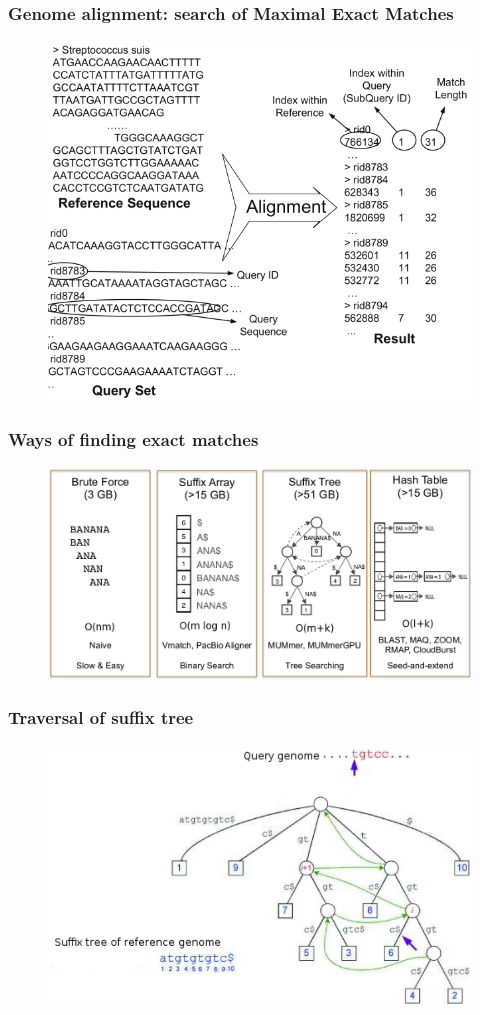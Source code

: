 \documentclass{beamer}
\begin{document}
\begin{frame}
\frametitle{Genome alignment: search of Maximal Exact Matches}
\begin{figure}\includegraphics[scale=0.4]{problem.png}\end{figure}
\end{frame}
\begin{frame}
 \frametitle{Ways of finding exact matches}
\begin{figure}\includegraphics[scale=0.39]{state.png}\end{figure}
\end{frame}
\begin{frame}
  \frametitle{Traversal of suffix tree}
  \begin{figure}\includegraphics[scale=0.8]{st-mum.pdf}\end{figure}
\end{frame}
\end{document}
